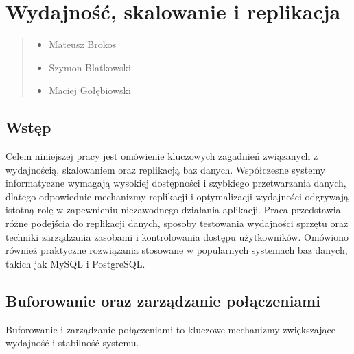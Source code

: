\documentclass[a4paper,11pt,openany,english]{sphinxmanual}
\begin{document}
\section{Wydajność, skalowanie i replikacja}
\label{\detokenize{rozdzial2/Wydajnosc-Skalowanie-i-Replikacja/index:wydajnosc-skalowanie-i-replikacja}}\label{\detokenize{rozdzial2/Wydajnosc-Skalowanie-i-Replikacja/index::doc}}\begin{quote}\begin{description}
\begin{itemize}
\item {} 
\sphinxAtStartPar
Mateusz Brokos

\item {} 
\sphinxAtStartPar
Szymon Blatkowski

\item {} 
\sphinxAtStartPar
Maciej Gołębiowski

\end{itemize}

\end{description}\end{quote}


\subsection{Wstęp}
\label{\detokenize{rozdzial2/Wydajnosc-Skalowanie-i-Replikacja/index:wstep}}
\sphinxAtStartPar
Celem niniejszej pracy jest omówienie kluczowych zagadnień związanych z wydajnością, skalowaniem oraz replikacją baz danych. Współczesne systemy informatyczne wymagają wysokiej dostępności i szybkiego przetwarzania danych, dlatego odpowiednie mechanizmy replikacji i optymalizacji wydajności odgrywają istotną rolę w zapewnieniu niezawodnego działania aplikacji. Praca przedstawia różne podejścia do replikacji danych, sposoby testowania wydajności sprzętu oraz techniki zarządzania zasobami i kontrolowania dostępu użytkowników. Omówiono również praktyczne rozwiązania stosowane w popularnych systemach baz danych, takich jak MySQL i PostgreSQL.


\subsection{Buforowanie oraz zarządzanie połączeniami}
\label{\detokenize{rozdzial2/Wydajnosc-Skalowanie-i-Replikacja/index:buforowanie-oraz-zarzadzanie-polaczeniami}}
\sphinxAtStartPar
Buforowanie i zarządzanie połączeniami to kluczowe mechanizmy zwiększające wydajność i stabilność systemu.
\end{document}

